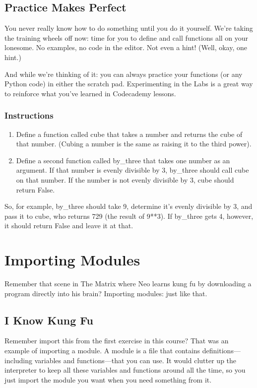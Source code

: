 \documentclass[12pt,a4paper,final,twoside,onecolumn,titlepage]{book}
\begin{document}
\subsection{Practice Makes Perfect}

You never really know how to do something until you do it yourself. We're taking the training wheels off now: time for you to define and call functions all on your lonesome. No examples, no code in the editor. Not even a hint! (Well, okay, one hint.)

And while we're thinking of it: you can always practice your functions (or any Python code) in either the scratch pad. Experimenting in the Labs is a great way to reinforce what you've learned in Codecademy lessons.
\subsubsection{Instructions}
\begin{enumerate}
\item    Define a function called cube that takes a number and returns the cube of that number. (Cubing a number is the same as raising it to the third power).

\item    Define a second function called by\_three that takes one number as an argument. If that number is evenly divisible by 3, by\_three should call cube on that number. If the number is not evenly divisible by 3, cube should return False.
\end{enumerate}
So, for example, by\_three should take 9, determine it's evenly divisible by 3, and pass it to cube, who returns 729 (the result of 9**3). If by\_three gets 4, however, it should return False and leave it at that.

    
\section{Importing Modules}
Remember that scene in The Matrix where Neo learns kung fu by downloading a program directly into his brain? Importing modules: just like that.

\subsection{I Know Kung Fu}

Remember import this from the first exercise in this course? That was an example of importing a module. A module is a file that contains definitions—including variables and functions—that you can use. It would clutter up the interpreter to keep all these variables and functions around all the time, so you just import the module you want when you need something from it.
\end{document}
